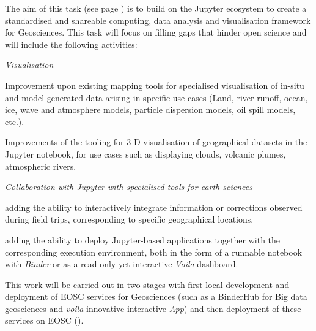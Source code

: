 \begin{task}[
  title=Demonstrator: Geosciences,
  id=geoscience,
  lead=UIO,
  PM=22,
  partners={QS,SRL}
]


The aim of this task (see page \pageref{sec:concept-demonstrators-geo}) is to build on the Jupyter ecosystem to create a standardised and shareable computing, data analysis and visualisation framework for Geosciences. This task will focus on filling gaps that hinder open science and will include the following activities:

\emph{Visualisation}

\begin{compactitem}
  \item Improvement upon existing mapping tools for specialised
    visualisation of in-situ and model-generated data arising in
    specific use cases (Land, river-runoff, ocean, ice, wave and
    atmosphere models, particle dispersion models, oil spill models,
    etc.).

  \item Improvements of the tooling for 3-D visualisation of
    geographical datasets in the Jupyter notebook, for use cases such as
    displaying clouds, volcanic plumes, atmospheric rivers.
\end{compactitem}

\emph{Collaboration with Jupyter with specialised tools for earth sciences}

\begin{compactitem}
  \item adding the ability to interactively integrate information or corrections
    observed during field trips, corresponding to specific geographical locations.


  \item adding the ability to deploy Jupyter-based applications together with
    the corresponding execution environment, both in the form of a runnable
    notebook with \emph{Binder} or as a read-only yet interactive \emph{Voila}
    dashboard.
\end{compactitem}

This work will be carried out in two stages with first local development and deployment of \TheProject EOSC services for Geosciences 
(such as a BinderHub for Big data geosciences and \emph{voila} innovative interactive \emph{App}) and then deployment of these services on EOSC ().
\end{task}
